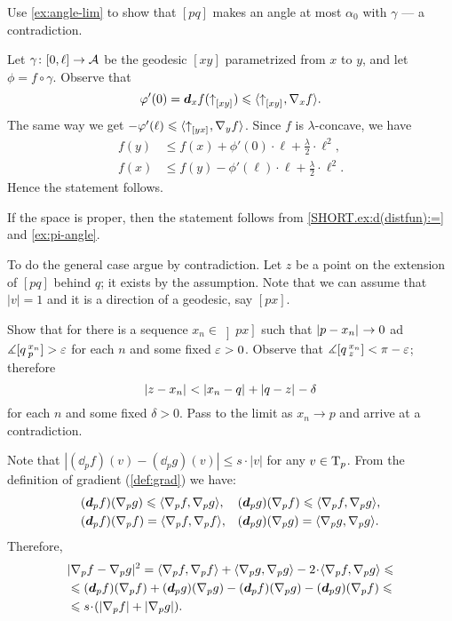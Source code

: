 Use \ref{ex:angle-lim} to show that $[pq]$ makes an angle at most $\alpha_0$ with $\gamma$ --- a contradiction.
 
Let $\gamma\colon[0,\ell]\to \mathcal{A}$ be the geodesic $[xy]$ parametrized from $x$ to $y$,
and let $\phi=f\circ\gamma$.
Observe that 
\[\varphi'(0)=\bm{d}_xf({\uparrow}_{[{x}{y}]_{{}}})\leqslant \langle{\uparrow}_{[{x}{y}]_{{}}},\nabla_{x}f\rangle.\]
The same way we get $-\varphi'(\ell)\leqslant \langle{\uparrow}_{[{y}{x}]_{{}}},\nabla_{y}f\rangle$.
Since $f$ is $\lambda$-concave, we have
\begin{align*}
f(y)&\le f(x)+\phi'(0)\cdot \ell+\tfrac\lambda2\cdot\ell^2,
\\
f(x)&\le f(y)-\phi'(\ell)\cdot \ell+\tfrac\lambda2\cdot\ell^2.
\end{align*}
Hence the statement follows.

If the space is proper, then the statement follows from \ref{SHORT.ex:d(distfun):=} and \ref{ex:pi-angle}.

To do the general case argue by contradiction.
Let $z$ be a point on the extension of $[pq]$ behind $q$;
it exists by the assumption.
Note that we can assume that $|v|=1$ and it is a direction of a geodesic, say $[px]$.

Show that for there is a sequence $x_n\in \left]px\right]$ such that $|{p}-{x_n}|_{}^{{}}\to0$ ad
$\measuredangle [q\,{}^{x_n}_{p}]>\varepsilon$ for each $n$ and some fixed $\varepsilon>0$.
Observe that $\measuredangle[q\,{}^{x_n}_{z}]<\pi-\varepsilon$; therefore
\[\dist{z}{x_n}{}<\dist{x_n}{q}{}+\dist{q}z{}-\delta\]
for each $n$ and some fixed $\delta>0$.
Pass to the limit as $x_n\to p$ and arrive at a contradiction.

Note that
$|(\dd_p f)(v)-(\dd_p g)(v)|\le s\cdot|v|$
for any $v\in \mathrm{T}_p$.
From the definition of gradient (\ref{def:grad}) we have:
\begin{align*}
&(\bm{d}_p f)(\nabla_p g)\leqslant\langle\nabla_p f,\nabla_p g\rangle,
&&(\bm{d}_p g)(\nabla_p f)\leqslant\langle\nabla_p f,\nabla_p g\rangle,
\\
&(\bm{d}_p f)(\nabla_p f)=\langle\nabla_p f,\nabla_p f\rangle,
&&(\bm{d}_p g)(\nabla_p g)=\langle\nabla_p g,\nabla_p g\rangle.
\end{align*}
Therefore,
\begin{align*}
&\dist[2]{\nabla_pf}{\nabla_pg}{}
=\<\nabla_p f,\nabla_p f\>+\<\nabla_p g,\nabla_p g\>-2\cdot\<\nabla_p f,\nabla_p g\>
\le
\\
&\le (\dd_p f)(\nabla_p f)+(\dd_p g)(\nabla_p g)-
(\dd_p f)(\nabla_p g)-(\dd_p g)(\nabla_p f)
\le
\\
&\le s\cdot(|\nabla_p f|+|\nabla_p g|).
\end{align*}

